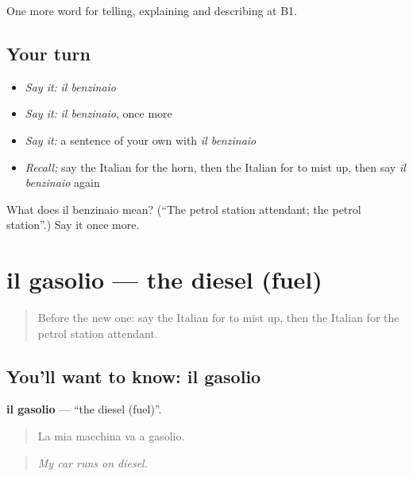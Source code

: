 \begin{grammarlens}[title={What you've built}]
One more word for telling, explaining and describing at B1.
\end{grammarlens}

\subsection*{Your turn}
\begin{itemize}
\raggedright
  \item \emph{Say it:} \emph{il benzinaio}
  \item \emph{Say it:} \emph{il benzinaio}, once more
  \item \emph{Say it:} a sentence of your own with \emph{il benzinaio}
  \item \emph{Recall:} say the Italian for the horn, then the Italian for to mist up, then say \emph{il benzinaio} again
\end{itemize}

\begin{tcolorbox}[breakable,colback=teal!4,colframe=teal!35!black,title={Before you move on}]
What does il benzinaio mean? (\textquotedblleft{}The petrol station attendant; the petrol station\textquotedblright{}.) Say it once more.
\end{tcolorbox}
\section[il gasolio]{il gasolio — the diesel (fuel)}

\label{lesson:IT-C408-gasolio}



\begin{quote}
Before the new one: say the Italian for to mist up, then the Italian for the petrol station attendant.
\end{quote}

\subsection*{You'll want to know: il gasolio}
\textbf{il gasolio} — \textquotedblleft{}the diesel (fuel)\textquotedblright{}.

\begin{quote}
La mia macchina va a gasolio.
\end{quote}

\begin{quote}
\emph{My car runs on diesel.}
\end{quote}

